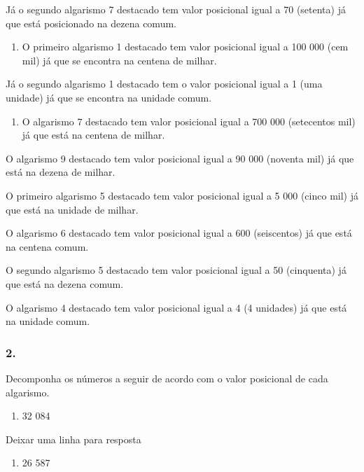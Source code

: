 Já o segundo algarismo 7 destacado tem valor posicional igual a 70
(setenta) já que está posicionado na dezena comum.

\begin{enumerate}
\def\labelenumi{\alph{enumi})}
\item
  O primeiro algarismo 1 destacado tem valor posicional igual a 100 000
  (cem mil) já que se encontra na centena de milhar.
\end{enumerate}

Já o segundo algarismo 1 destacado tem o valor posicional igual a 1 (uma
unidade) já que se encontra na unidade comum.

\begin{enumerate}
\def\labelenumi{\alph{enumi})}
\item
  O algarismo 7 destacado tem valor posicional igual a 700 000
  (setecentos mil) já que está na centena de milhar.
\end{enumerate}

O algarismo 9 destacado tem valor posicional igual a 90 000 (noventa
mil) já que está na dezena de milhar.

O primeiro algarismo 5 destacado tem valor posicional igual a 5 000
(cinco mil) já que está na unidade de milhar.

O algarismo 6 destacado tem valor posicional igual a 600 (seiscentos) já
que está na centena comum.

O segundo algarismo 5 destacado tem valor posicional igual a 50
(cinquenta) já que está na dezena comum.

O algarismo 4 destacado tem valor posicional igual a 4 (4 unidades) já
que está na unidade comum.

\subsubsection{2.}\label{section-1}

Decomponha os números a seguir de acordo com o valor posicional de cada
algarismo.

\begin{enumerate}
\def\labelenumi{\alph{enumi})}
\item
  32 084
\end{enumerate}

Deixar uma linha para resposta

\begin{enumerate}
\def\labelenumi{\alph{enumi})}
\item
  26 587
\end{enumerate}


